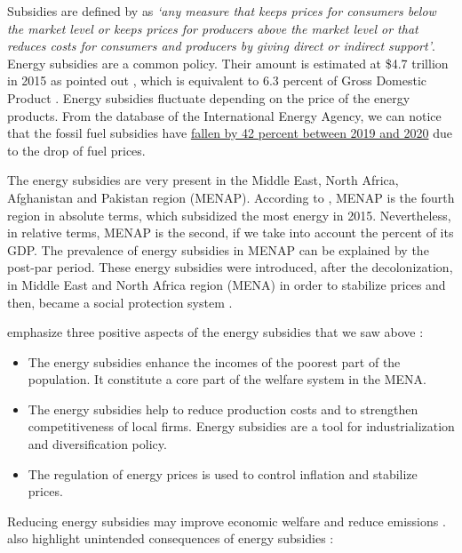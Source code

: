 \documentclass[
]{article}
\begin{document}
Subsidies are defined by \textcite{demoor1997} as \emph{`any measure
that keeps prices for consumers below the market level or keeps prices
for producers above the market level or that reduces costs for consumers
and producers by giving direct or indirect support'}. Energy subsidies
are a common policy. Their amount is estimated at \$4.7 trillion in 2015
as pointed out \textcite{coady2019}, which is equivalent to 6.3 percent
of Gross Domestic Product . Energy subsidies fluctuate depending on the
price of the energy products. From the database of the International
Energy Agency, we can notice that the fossil fuel subsidies have
\href{https://www.iea.org/topics/energy-subsidies}{fallen by 42 percent
between 2019 and 2020} due to the drop of fuel prices.

The energy subsidies are very present in the Middle East, North Africa,
Afghanistan and Pakistan region (MENAP). According to
\textcite{coady2019}, MENAP is the fourth region in absolute terms,
which subsidized the most energy in 2015. Nevertheless, in relative
terms, MENAP is the second, if we take into account the percent of its
GDP. The prevalence of energy subsidies in MENAP can be explained by the
post-par period. These energy subsidies were introduced, after the
decolonization, in Middle East and North Africa region (MENA) in order
to stabilize prices and then, became a social protection system
\autocite{verme2017}.

\textcite{fattouh2013} emphasize three positive aspects of the energy
subsidies that we saw above :

\begin{itemize}
\item
  The energy subsidies enhance the incomes of the poorest part of the
  population. It constitute a core part of the welfare system in the
  MENA.
\item
  The energy subsidies help to reduce production costs and to strengthen
  competitiveness of local firms. Energy subsidies are a tool for
  industrialization and diversification policy.
\item
  The regulation of energy prices is used to control inflation and
  stabilize prices.
\end{itemize}

Reducing energy subsidies may improve economic welfare and reduce
emissions \autocites[ ]{aldy2013}[ ]{coady2019}{hahn2021}.
\textcite{fattouh2013} also highlight unintended consequences of energy
subsidies :
\end{document}
